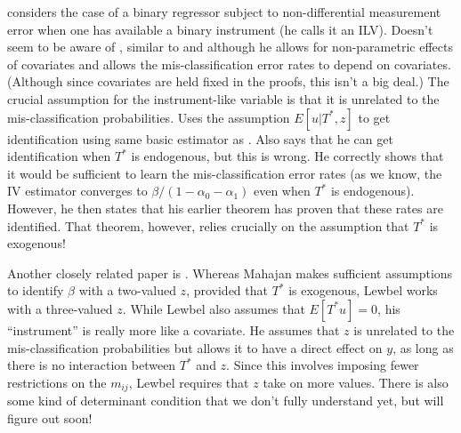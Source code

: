 \cite{Mahajan} considers the case of a binary regressor subject to non-differential measurement error when one has available a binary instrument (he calls it an ILV).
Doesn't seem to be aware of \cite{FL}, similar to \cite{BBS} and \cite{KRS} although he allows for non-parametric effects of covariates and allows the mis-classification error rates to depend on covariates.
(Although since covariates are held fixed in the proofs, this isn't a big deal.)
The crucial assumption for the instrument-like variable is that it is unrelated to the mis-classification probabilities.
Uses the assumption $E[u|T^*,z]$ to get identification using same basic estimator as \cite{BBS}.
Also says that he can get identification when $T^*$ is endogenous, but this is wrong.
He correctly shows that it would be sufficient to learn the mis-classification error rates (as we know, the IV estimator converges to $\beta/(1-\alpha_0-\alpha_1)$ even when $T^*$ is endogenous).
However, he then states that his earlier theorem has proven that these rates are identified. 
That theorem, however, relies crucially on the assumption that $T^*$ is exogenous!

Another closely related paper is \cite{Lewbel}.
Whereas Mahajan makes sufficient assumptions to identify $\beta$ with a two-valued $z$, provided that $T^*$ is exogenous, Lewbel works with a three-valued $z$.
While Lewbel also assumes that $E[T^*u]=0$, his ``instrument'' is really more like a covariate.
He assumes that $z$ is unrelated to the mis-classification probabilities but allows it to have a direct effect on $y$, as long as there is no interaction between $T^*$ and $z$.
Since this involves imposing fewer restrictions on the $m_{ij}$, Lewbel requires that $z$ take on more values.
There is also some kind of determinant condition that we don't fully understand yet, but will figure out soon!




















